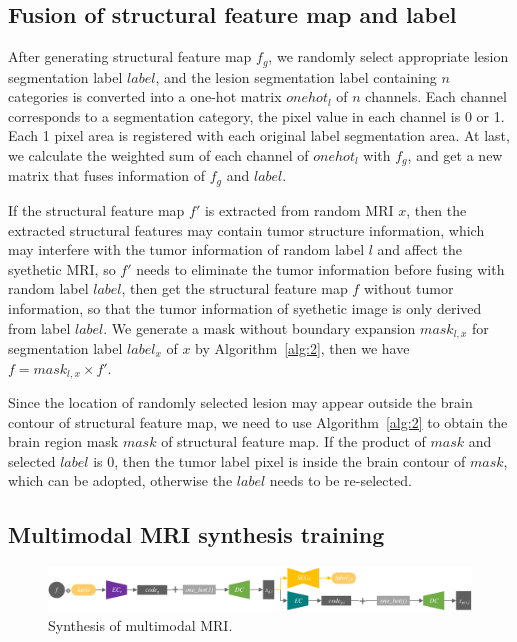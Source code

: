 \documentclass{ecai}
\begin{document}
\subsection{Fusion of structural feature map and label}

After generating structural feature map $f_g$, we randomly select appropriate lesion segmentation label $label$, and the lesion segmentation label containing $n$ categories is converted into a one-hot matrix $onehot_l$ of $n$ channels. Each channel corresponds to a segmentation category, the pixel value in each channel is 0 or 1. Each 1 pixel area is registered with each original label segmentation area. At last, we calculate the weighted sum of each channel of $onehot_l$ with $f_g$, and get a new matrix that fuses information of $f_g$ and $label$.

If the structural feature map $f'$ is extracted from random MRI $x$, then the extracted structural features may contain tumor structure information, which may interfere with the tumor information of random label $l$ and affect the syethetic MRI, so $f'$ needs to eliminate the tumor information before fusing with random label $label$, then get the structural feature map $f$ without tumor information, so that the tumor information of syethetic image is only derived from label $label$. We generate a mask without boundary expansion $mask_{l,x}$ for segmentation label $label_x$ of $x$ by Algorithm~\ref{alg:2}, then we have $f=mask_{l,x}\times f'$.

Since the location of randomly selected lesion may appear outside the brain contour of structural feature map, we need to use Algorithm~\ref{alg:2} to obtain the brain region mask $mask$ of structural feature map. If the product of $mask$ and selected $label$ is 0, then the tumor label pixel is inside the brain contour of $mask$, which can be adopted, otherwise the $label$ needs to be re-selected.

\subsection{Multimodal MRI synthesis training}
\begin{figure}
	\centering
	\includegraphics[width=1.98\columnwidth]{figures/mm_mri_generate}
	\caption{Synthesis of multimodal MRI.}
	\label{mm_mri_generate}
\end{figure}
\end{document}
